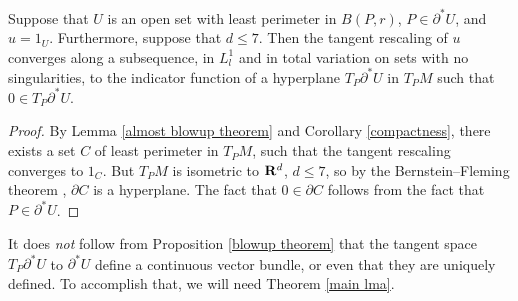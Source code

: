 \begin{proposition}\label{blowup theorem}
Suppose that $U$ is an open set with least perimeter in $B(P, r)$, $P \in \partial^* U$, and $u = 1_U$.
Furthermore, suppose that $d \leq 7$.
Then the tangent rescaling of $u$ converges along a subsequence, in $L^1_l$ and in total variation on sets with no singularities, to the indicator function of a hyperplane $T_P \partial^* U$ in $T_PM$ such that $0 \in T_P \partial^* U$.
\end{proposition}
\begin{proof}
By Lemma \ref{almost blowup theorem} and Corollary \ref{compactness}, there exists a set $C$ of least perimeter in $T_PM$, such that the tangent rescaling converges to $1_C$.
But $T_PM$ is isometric to $\mathbf{R}^d$, $d \leq 7$, so by the Bernstein--Fleming theorem \cite[Theorem 17.3]{Giusti77} \cite[\S5]{Fleming62}, $\partial C$ is a hyperplane.
The fact that $0 \in \partial C$ follows from the fact that $P \in \partial^* U$.
\end{proof}

It does \emph{not} follow from Proposition \ref{blowup theorem} that the tangent space $T_P \partial^* U$ to $\partial^* U$ define a continuous vector bundle, or even that they are uniquely defined. To accomplish that, we will need Theorem \ref{main lma}.
